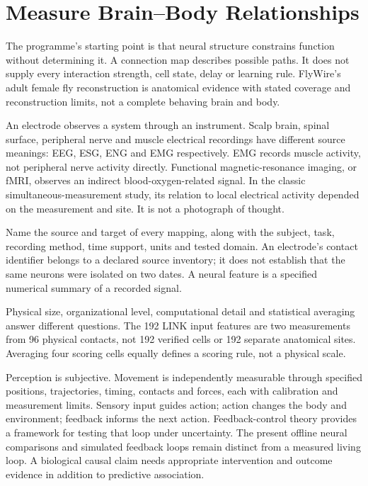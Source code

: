 \section{Measure Brain--Body Relationships}

The programme's starting point is that neural structure constrains function
without determining it. A connection map describes possible paths. It does not
supply every interaction strength, cell state, delay or learning rule. FlyWire's
adult female fly reconstruction is anatomical evidence with stated coverage and
reconstruction limits, not a complete behaving brain and body.\citep{flywire2024}

An electrode observes a system through an instrument. Scalp brain, spinal surface, peripheral nerve and muscle electrical recordings have different source meanings: EEG, ESG, ENG and EMG respectively. EMG records muscle activity, not peripheral nerve activity directly. Functional magnetic-resonance imaging, or fMRI, observes an indirect blood-oxygen-related signal. In the classic simultaneous-measurement study, its relation to local electrical activity depended on the measurement and site. It is not a photograph of thought.\citep{logothetis2001}

Name the source and target of every mapping, along with the subject, task, recording method, time support, units and tested domain. An electrode's contact identifier belongs to a declared source inventory; it does not establish that the same neurons were isolated on two dates. A neural feature is a specified numerical summary of a recorded signal.

Physical size, organizational level, computational detail and statistical averaging answer different questions. The 192 LINK input features are two measurements from 96 physical contacts, not 192 verified cells or 192 separate anatomical sites. Averaging four scoring cells equally defines a scoring rule, not a physical scale.

Perception is subjective. Movement is independently measurable through specified
positions, trajectories, timing, contacts and forces, each with calibration and
measurement limits. Sensory input guides action; action changes the body and
environment; feedback informs the next action. Feedback-control theory provides
a framework for testing that loop under uncertainty.\citep{todorov2002}
The present offline neural comparisons and simulated feedback loops remain
distinct from a measured living loop. A biological causal claim needs appropriate
intervention and outcome evidence in addition to predictive association.

